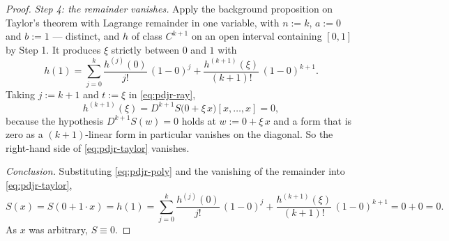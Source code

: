 \begin{proof}
\medskip\noindent\emph{Step 4: the remainder vanishes.}
Apply the background proposition on Taylor's theorem with Lagrange remainder in one variable,
with $n:=k$, $a:=0$ and $b:=1$ --- distinct, and $h$ of class $C^{k+1}$ on an open interval
containing $[0,1]$ by Step 1.  It produces $\xi$ strictly between $0$ and $1$ with
\begin{equation}\label{eq:pdjr-taylor}
  h(1)=\sum_{j=0}^{k}\frac{h^{(j)}(0)}{j!}\,(1-0)^{j}
        +\frac{h^{(k+1)}(\xi)}{(k+1)!}\,(1-0)^{k+1}.
\end{equation}
Taking $j:=k+1$ and $t:=\xi$ in \eqref{eq:pdjr-ray},
\[
  h^{(k+1)}(\xi)=D^{k+1}S\bigl(0+\xi\,x\bigr)[x,\ldots,x]=0 ,
\]
because the hypothesis $D^{k+1}S(w)=0$ holds at $w:=0+\xi\,x$ and a form that is zero as a
$(k+1)$-linear form in particular vanishes on the diagonal.  So the right-hand side of
\eqref{eq:pdjr-taylor} vanishes.

\medskip\noindent\emph{Conclusion.}
Substituting \eqref{eq:pdjr-poly} and the vanishing of the remainder into
\eqref{eq:pdjr-taylor},
\[
  S(x)=S(0+1\cdot x)=h(1)
  =\sum_{j=0}^{k}\frac{h^{(j)}(0)}{j!}\,(1-0)^{j}
    +\frac{h^{(k+1)}(\xi)}{(k+1)!}\,(1-0)^{k+1}
  =0+0=0 .
\]
As $x$ was arbitrary, $S\equiv0$.
\end{proof}
